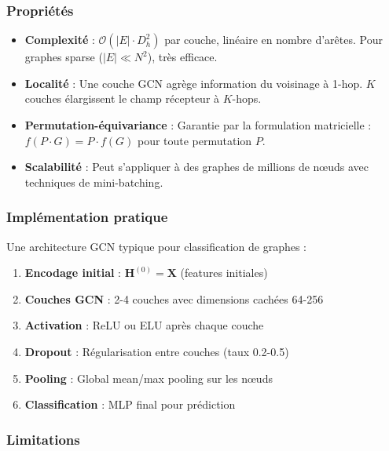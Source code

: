 \subsubsection{Propriétés}

\begin{itemize}
    \item \textbf{Complexité} : $\mathcal{O}(|E| \cdot D_h^2)$ par couche, linéaire en nombre d'arêtes. Pour graphes sparse ($|E| \ll N^2$), très efficace.
    \item \textbf{Localité} : Une couche GCN agrège information du voisinage à 1-hop. $K$ couches élargissent le champ récepteur à $K$-hops.
    \item \textbf{Permutation-équivariance} : Garantie par la formulation matricielle : $f(P \cdot G) = P \cdot f(G)$ pour toute permutation $P$.
    \item \textbf{Scalabilité} : Peut s'appliquer à des graphes de millions de nœuds avec techniques de mini-batching.
\end{itemize}

\subsubsection{Implémentation pratique}

Une architecture GCN typique pour classification de graphes :
\begin{enumerate}
    \item \textbf{Encodage initial} : $\mathbf{H}^{(0)} = \mathbf{X}$ (features initiales)
    \item \textbf{Couches GCN} : 2-4 couches avec dimensions cachées 64-256
    \item \textbf{Activation} : ReLU ou ELU après chaque couche
    \item \textbf{Dropout} : Régularisation entre couches (taux 0.2-0.5)
    \item \textbf{Pooling} : Global mean/max pooling sur les nœuds
    \item \textbf{Classification} : MLP final pour prédiction
\end{enumerate}

\subsubsection{Limitations}

